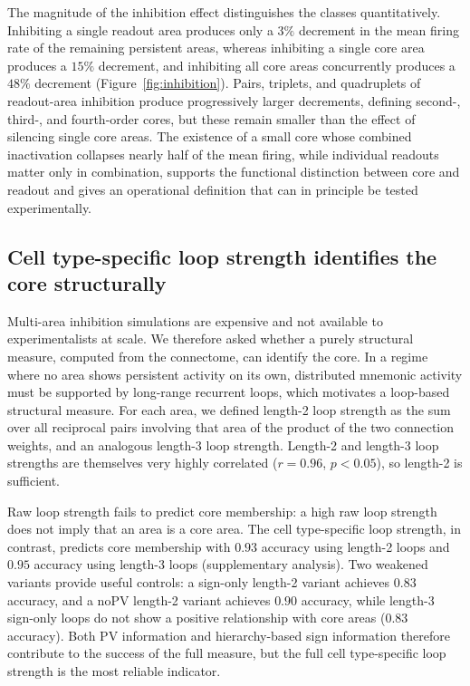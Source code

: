 \documentclass[11pt]{article}
\begin{document}
The magnitude of the inhibition effect distinguishes the classes quantitatively. Inhibiting a single readout area produces only a $3\%$ decrement in the mean firing rate of the remaining persistent areas, whereas inhibiting a single core area produces a $15\%$ decrement, and inhibiting all core areas concurrently produces a $48\%$ decrement (Figure~\ref{fig:inhibition}). Pairs, triplets, and quadruplets of readout-area inhibition produce progressively larger decrements, defining second-, third-, and fourth-order cores, but these remain smaller than the effect of silencing single core areas. The existence of a small core whose combined inactivation collapses nearly half of the mean firing, while individual readouts matter only in combination, supports the functional distinction between core and readout and gives an operational definition that can in principle be tested experimentally.

\subsection{Cell type-specific loop strength identifies the core structurally}

Multi-area inhibition simulations are expensive and not available to experimentalists at scale. We therefore asked whether a purely structural measure, computed from the connectome, can identify the core. In a regime where no area shows persistent activity on its own, distributed mnemonic activity must be supported by long-range recurrent loops, which motivates a loop-based structural measure. For each area, we defined length-2 loop strength as the sum over all reciprocal pairs involving that area of the product of the two connection weights, and an analogous length-3 loop strength. Length-2 and length-3 loop strengths are themselves very highly correlated ($r=0.96$, $p<0.05$), so length-2 is sufficient.

Raw loop strength fails to predict core membership: a high raw loop strength does not imply that an area is a core area. The cell type-specific loop strength, in contrast, predicts core membership with $0.93$ accuracy using length-2 loops and $0.95$ accuracy using length-3 loops (supplementary analysis). Two weakened variants provide useful controls: a sign-only length-2 variant achieves $0.83$ accuracy, and a noPV length-2 variant achieves $0.90$ accuracy, while length-3 sign-only loops do not show a positive relationship with core areas ($0.83$ accuracy). Both PV information and hierarchy-based sign information therefore contribute to the success of the full measure, but the full cell type-specific loop strength is the most reliable indicator.
\end{document}
